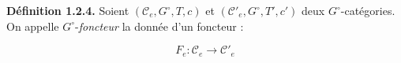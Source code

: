 \noindent\textbf{Définition 1.2.4.}\quad
Soient $(\mathcal C_e,G^\circ,T,c)$ et
$(\mathcal C'_e,G^\circ,T',c')$ deux $G^\circ$-catégories. On appelle
$G^\circ$-\emph{foncteur} la donnée d'un foncteur :

\[
  F_e\colon\mathcal C_e\longrightarrow\mathcal C'_e
\]
